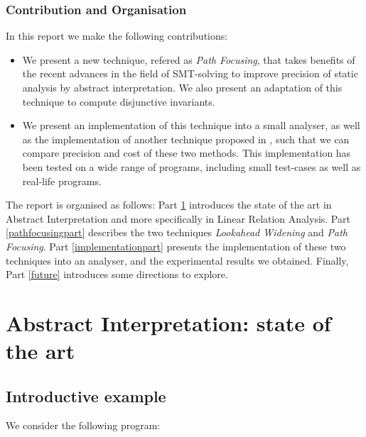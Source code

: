 \documentclass[a4paper,english,titlepage,11pt]{report}
\begin{document}
\subsection*{Contribution and Organisation}

In this report we make the following contributions:
\begin{itemize}
\item We present a new technique, refered as \emph{Path Focusing}, that takes
benefits of the recent advances in the field of SMT-solving to improve precision
of static analysis by abstract interpretation. We also present an adaptation of
this technique to compute disjunctive invariants.
\item We present an implementation of this technique into a small analyser, as
well as the implementation of another technique proposed in \cite{GopanR06},
such that we can compare precision and cost of these two methods. This
implementation has been tested on a wide range of programs, including small
test-cases as well as real-life programs.
\end{itemize}

The report is organised as follows:
Part \ref{stateoftheartpart} introduces the state of the art in Abstract
Interpretation and more specifically in Linear Relation Analysis.
Part \ref{pathfocusingpart} describes the two techniques
\emph{Lookahead Widening} and \emph{Path Focusing}.
Part \ref{implementationpart} presents the implementation of these two
techniques into an analyser, and the experimental results we obtained.
Finally, Part \ref{future} introduces some directions to explore.

\chapter{Abstract Interpretation: state of the art}
\label{stateoftheartpart}

\section{Introductive example}

We consider the following program:
\end{document}
